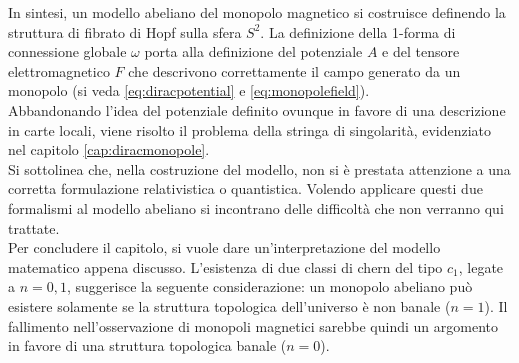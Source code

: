 In sintesi, un modello abeliano del monopolo magnetico si costruisce definendo
la struttura di fibrato di Hopf sulla sfera $S^2$. La definizione della 1-forma
di connessione globale $\omega$ porta alla definizione del potenziale $A$
e del tensore elettromagnetico $F$ che descrivono correttamente il campo
generato da un monopolo (si veda \ref{eq:diracpotential} e \ref{eq:monopolefield}).\\
Abbandonando l'idea del potenziale definito ovunque in favore di una descrizione
in carte locali, viene risolto il problema della stringa di singolarità, evidenziato
nel capitolo \ref{cap:diracmonopole}.\\
Si sottolinea che, nella costruzione del modello, non si è prestata attenzione
a una corretta formulazione relativistica o quantistica. Volendo applicare questi
due formalismi al modello abeliano si incontrano delle difficoltà che non verranno
qui trattate.\\

Per concludere il capitolo, si vuole dare un'interpretazione del modello
matematico appena discusso. L'esistenza di due classi di chern del tipo $c_1$,
legate a $n = 0,1$, suggerisce la seguente considerazione: un monopolo abeliano
può esistere solamente se la struttura topologica dell'universo è non banale ($n=1$).
Il fallimento nell'osservazione di monopoli magnetici sarebbe quindi
un argomento in favore di una struttura topologica banale ($n=0$).
